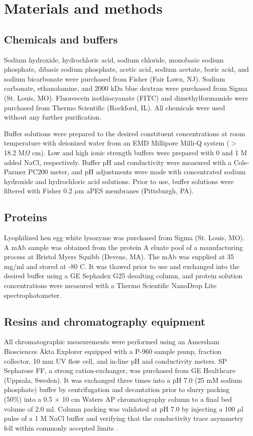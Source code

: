\documentclass[preprint,review,12pt]{elsarticle}
\begin{document}
\section{Materials and methods} \label{sec:mm}

    \subsection{Chemicals and buffers} \label{ssec:buffers}
        Sodium hydroxide, hydrochloric acid, sodium chloride, monobasic sodium phosphate, dibasic sodium phosphate, acetic acid, sodium acetate, boric acid, and sodium bicarbonate were purchased from Fisher (Fair Lawn, NJ). Sodium carbonate, ethanolamine, and 2000 kDa blue dextran were purchased from Sigma (St. Louis, MO). Fluorescein isothiocyanate (FITC) and dimethylformamide were purchased from Thermo Scientific (Rockford, IL). All chemicals were used without any further purification.

        Buffer solutions were prepared to the desired constituent concentrations at room temperature with deionized water from an EMD Millipore Milli-Q system ($>$ 18.2 M$\Omega$ cm). Low and high ionic strength buffers were prepared with 0 and 1 M added NaCl, respectively. Buffer pH and conductivity were measured with a Cole-Parmer PC200 meter, and pH adjustments were made with concentrated sodium hydroxide and hydrochloric acid solutions. Prior to use, buffer solutions were filtered with Fisher 0.2 $\mu$m aPES membranes (Pittsburgh, PA).

    \subsection{Proteins} \label{ssec:proteins}
        Lyophilized hen egg white lysozyme was purchased from Sigma (St. Louis, MO). A mAb sample was obtained from the protein A eluate pool of a manufacturing process at Bristol Myers Squibb (Devens, MA). The mAb was supplied at 35 mg/ml and stored at -80 \degree C. It was thawed prior to use and exchanged into the desired buffer using a GE Sephadex G25 desalting column, and protein solution concentrations were measured with a Thermo Scientific NanoDrop Lite spectrophotometer.

    \subsection{Resins and chromatography equipment} \label{ssec:equip}
        All chromatographic measurements were performed using an Amersham Biosciences \"{A}kta Explorer equipped with a P-960 sample pump, fraction collector, 10 mm UV flow cell, and in-line pH and conductivity meters. SP Sepharose FF, a strong cation-exchanger, was purchased from GE Healthcare (Uppsala, Sweden). It was exchanged three times into a pH 7.0 (25 mM sodium phosphate) buffer by centrifugation and decantation prior to slurry packing (50\%) into a 0.5 $\times$ 10 cm Waters AP chromatography column to a final bed volume of 2.0 ml. Column packing was validated at pH 7.0 by injecting a 100 $\mu$l pulse of a 1 M NaCl buffer and verifying that the conductivity trace asymmetry fell within commonly accepted limits \cite{Carta2010a}.
\end{document}
